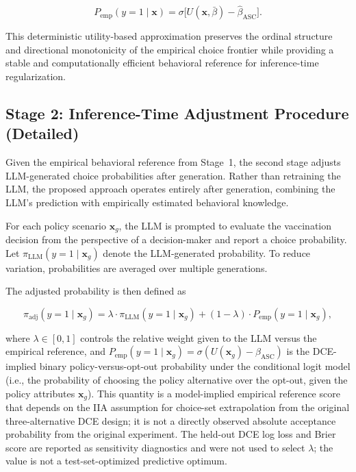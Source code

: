 \documentclass[11pt]{article}
\begin{document}
\[
P_{\mathrm{emp}}(y=1\mid\mathbf{x})
=
\sigma\!\bigl[U(\mathbf{x}, \bar\beta) - \hat\beta_{\mathrm{ASC}}\bigr].
\]

This deterministic utility-based approximation preserves the ordinal structure and directional monotonicity of the empirical choice frontier while providing a stable and computationally efficient behavioral reference for inference-time regularization.
\subsection{Stage 2: Inference-Time Adjustment Procedure (Detailed)}

\label{sec:stage2}

Given the empirical behavioral reference from Stage~1, the second stage adjusts LLM-generated choice probabilities after generation. Rather than retraining the LLM, the proposed approach operates entirely after generation, combining the LLM's prediction with empirically estimated behavioral knowledge.

For each policy scenario $\mathbf{x}_g$, the LLM is prompted to evaluate the vaccination decision from the perspective of a decision-maker and report a choice probability. Let $\pi_{\mathrm{LLM}}(y=1\mid\mathbf{x}_g)$ denote the LLM-generated probability. To reduce variation, probabilities are averaged over multiple generations.

The adjusted probability is then defined as

\begin{equation}
\pi_{\mathrm{adj}}(y=1\mid\mathbf{x}_g) = \lambda \cdot \pi_{\mathrm{LLM}}(y=1\mid\mathbf{x}_g) + (1-\lambda) \cdot P_{\mathrm{emp}}(y=1\mid\mathbf{x}_g),
\label{eq:adjustment}
\end{equation}

where $\lambda \in [0,1]$ controls the relative weight given to the LLM versus the empirical reference, and $P_{\mathrm{emp}}(y=1\mid\mathbf{x}_g) = \sigma(U(\mathbf{x}_g) - \beta_{\mathrm{ASC}})$ is the DCE-implied binary policy-versus-opt-out probability under the conditional logit model (i.e., the probability of choosing the policy alternative over the opt-out, given the policy attributes $\mathbf{x}_g$). This quantity is a model-implied empirical reference score that depends on the IIA assumption for choice-set extrapolation from the original three-alternative DCE design; it is not a directly observed absolute acceptance probability from the original experiment. The held-out DCE log loss and Brier score are reported as sensitivity diagnostics and were not used to select $\lambda$; the value is not a test-set-optimized predictive optimum.
\end{document}
